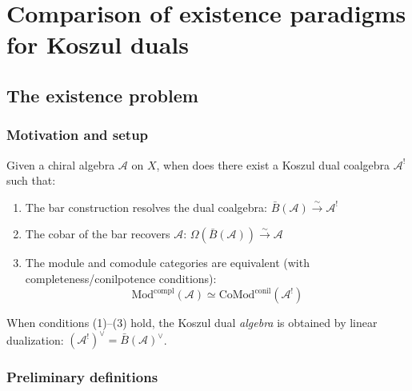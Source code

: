 
\chapter{Comparison of existence paradigms for Koszul duals}
\label{app:existence-criteria}


\begin{abstract}
Strict finite-type existence theorems for Koszul duals and the completion
construction of Appendix~\ref{app:nilpotent-completion} have different hypotheses.
This appendix compares them with quadratic and curved existence criteria.
No single necessary-and-sufficient condition for all these constructions is asserted.
\end{abstract}


\section{The existence problem}
\label{sec:existence-problem-statement}

\subsection{Motivation and setup}

\begin{question}\label{q:existence-central}
Given a chiral algebra $\mathcal{A}$ on $X$, when does there exist a
Koszul dual coalgebra $\mathcal{A}^!$ such that:
\begin{enumerate}
\item The bar construction resolves the dual coalgebra:
      $\bar{B}(\mathcal{A}) \xrightarrow{\sim} \mathcal{A}^!$
\item The cobar of the bar recovers $\mathcal{A}$:
      $\Omega(\bar{B}(\mathcal{A})) \xrightarrow{\sim} \mathcal{A}$
\item The module and comodule categories are equivalent (with
      completeness/conilpotence conditions):
      \[\mathrm{Mod}^{\mathrm{compl}}(\mathcal{A}) \simeq
      \mathrm{CoMod}^{\mathrm{conil}}(\mathcal{A}^!)\]
\end{enumerate}
When conditions (1)--(3) hold, the Koszul dual \emph{algebra} is
obtained by linear dualization:
$(\mathcal{A}^!)^{\vee} = \bar{B}(\mathcal{A})^{\vee}$.
\end{question}

\subsection{Preliminary definitions}

